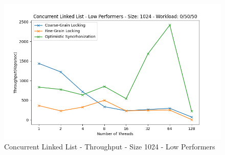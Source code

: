 \documentclass[../final_report.tex]{subfiles}
\begin{document}
\begin{figure}[H]
        \includegraphics[scale=0.4]{outFiles/plots/concurrent_data_structs_low_1024_0_50_50.png}
    \caption{Concurrent Linked List - Throughput - Size 1024 - Low Performers}
    \label{fig:Concurrent Linked List - Throughput - Size 1024 - Low Performers}
\end{figure}
\end{document}
